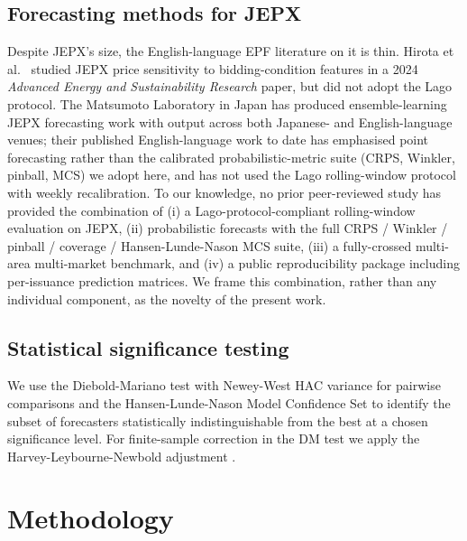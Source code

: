\documentclass[review,3p,times,authoryear]{elsarticle}
\begin{document}
\subsection{Forecasting methods for JEPX}
Despite JEPX's size, the English-language EPF literature on it is thin. Hirota et al.\ \citep{hirota2024} studied JEPX price sensitivity to bidding-condition features in a 2024 \emph{Advanced Energy and Sustainability Research} paper, but did not adopt the Lago protocol. The Matsumoto Laboratory in Japan has produced ensemble-learning JEPX forecasting work \citep{matsumoto_jepx_2025} with output across both Japanese- and English-language venues; their published English-language work to date has emphasised point forecasting rather than the calibrated probabilistic-metric suite (CRPS, Winkler, pinball, MCS) we adopt here, and has not used the Lago rolling-window protocol with weekly recalibration. To our knowledge, no prior peer-reviewed study has provided the combination of (i) a Lago-protocol-compliant rolling-window evaluation on JEPX, (ii) probabilistic forecasts with the full CRPS / Winkler / pinball / coverage / Hansen-Lunde-Nason MCS suite, (iii) a fully-crossed multi-area multi-market benchmark, and (iv) a public reproducibility package including per-issuance prediction matrices. We frame this combination, rather than any individual component, as the novelty of the present work.

\subsection{Statistical significance testing}
We use the Diebold-Mariano test \citep{diebold1995} with Newey-West HAC variance for pairwise comparisons and the Hansen-Lunde-Nason Model Confidence Set \citep{hansen2011} to identify the subset of forecasters statistically indistinguishable from the best at a chosen significance level. For finite-sample correction in the DM test we apply the Harvey-Leybourne-Newbold adjustment \citep{harvey1997}.

\section{Methodology}\label{sec:method}
\end{document}
